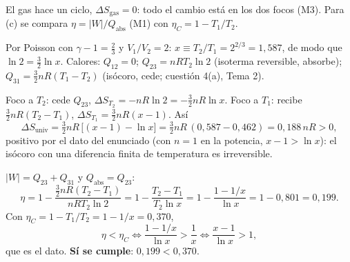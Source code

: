 \begin{resolucion}
\idea El gas hace un ciclo, $\Delta S_{\mathrm{gas}}=0$: todo el cambio está en los dos focos (M3). Para (c) se
compara $\eta=|W|/Q_{\mathrm{abs}}$ (M1) con $\eta_C=1-T_1/T_2$.

 Por Poisson con $\gamma-1=\tfrac23$ y $V_1/V_2=2$: $x\equiv T_2/T_1=2^{2/3}=1{,}587$, de modo que
$\ln2=\tfrac32\ln x$. Calores: $Q_{12}=0$; $Q_{23}=nRT_2\ln2$ (isoterma reversible, absorbe);
$Q_{31}=\tfrac32nR(T_1-T_2)$ (isócoro, cede; cuestión 4(a), Tema 2).

 Foco a $T_2$: cede $Q_{23}$, $\Delta S_{T_2}=-nR\ln2=-\tfrac32nR\ln x$. Foco a $T_1$:
recibe $\tfrac32nR(T_2-T_1)$, $\Delta S_{T_1}=\tfrac32nR(x-1)$. Así
\[
  \Delta S_{\mathrm{univ}}=\tfrac32nR\,\bigl[(x-1)-\ln x\bigr]=\tfrac32nR\,(0{,}587-0{,}462)=\boxed{0{,}188\,nR}>0,
\]
positivo por el dato del enunciado (con $n=1$ en la potencia, $x-1>\ln x$): el isócoro con una diferencia finita de
temperatura es irreversible.

 $|W|=Q_{23}+Q_{31}$ y $Q_{\mathrm{abs}}=Q_{23}$:
\[
  \eta=1-\frac{\tfrac32nR(T_2-T_1)}{nRT_2\ln2}=1-\frac{T_2-T_1}{T_2\ln x}=1-\frac{1-1/x}{\ln x}=1-0{,}801=0{,}199 .
\]
Con $\eta_C=1-T_1/T_2=1-1/x=0{,}370$,
\[
  \eta<\eta_C\iff\frac{1-1/x}{\ln x}>\frac1x\iff\frac{x-1}{\ln x}>1,
\]
que es el dato. \textbf{Sí se cumple}: $0{,}199<0{,}370$.
\end{resolucion}

